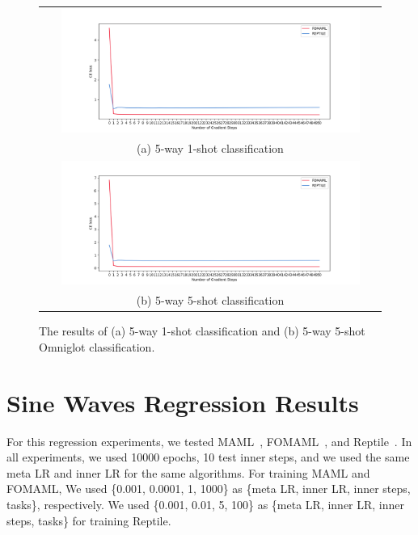 \documentclass[final]{cvpr}
\begin{document}
\begin{figure}[b]
    \centering
	\begin{tabular}{c}
		\includegraphics[width=0.9\textwidth]{resources/omniglot_5way_1shot.png}\\
		(a) 5-way 1-shot classification\\
		\includegraphics[width=0.9\textwidth]{resources/omniglot_5way_5shot.png}\\
		(b) 5-way 5-shot classification\\
	\end{tabular}\vspace{0.2cm}
	\caption{The results of (a) 5-way 1-shot classification and (b) 5-way 5-shot Omniglot classification.}
	\label{comp2}
\end{figure}


\section{Sine Waves Regression Results}
For this regression experiments, we tested MAML~\cite{maml}, FOMAML~\cite{maml}, and Reptile~\cite{reptile}. In all experiments, we used 10000 epochs, 10 test inner steps, and we used the same meta LR and inner LR for the same algorithms. For training MAML and FOMAML, We used \{0.001, 0.0001, 1, 1000\} as \{meta LR, inner LR, inner steps, tasks\}, respectively. We used \{0.001, 0.01, 5, 100\} as \{meta LR, inner LR, inner steps, tasks\} for training Reptile.
\end{document}
